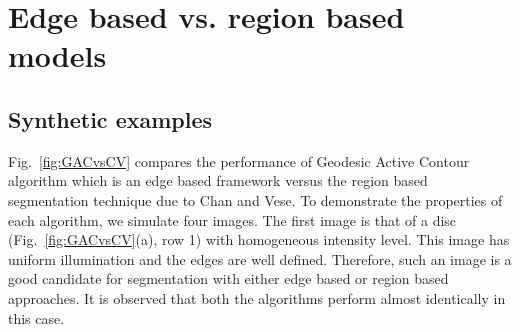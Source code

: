 \section{Edge based vs. region based models}

\subsection{Synthetic examples}
Fig.~\ref{fig:GACvsCV} compares the performance of Geodesic Active Contour \cite{caselles_geodesic} algorithm which is an edge based framework versus the region based segmentation technique due to Chan and Vese\cite{chan_vese}. To demonstrate the properties of each algorithm, we simulate four images. The first image is that of a disc (Fig.~\ref{fig:GACvsCV}(a), row 1) with homogeneous intensity level. This image has uniform illumination and the edges are well defined. Therefore, such an image is a good candidate for segmentation with either edge based or region based approaches. It is observed that both the algorithms perform almost identically in this case.
